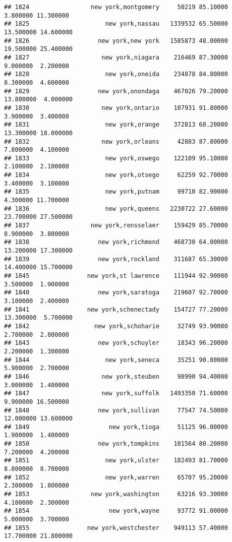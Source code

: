 \documentclass[
]{article}
\begin{document}
\begin{verbatim}
## 1824                 new york,montgomery     50219 85.10000  3.800000 11.300000
## 1825                     new york,nassau   1339532 65.50000 13.500000 14.600000
## 1826                   new york,new york   1585873 48.00000 19.500000 25.400000
## 1827                    new york,niagara    216469 87.30000  9.000000  2.200000
## 1828                     new york,oneida    234878 84.80000  8.300000  4.600000
## 1829                   new york,onondaga    467026 79.20000 13.800000  4.000000
## 1830                    new york,ontario    107931 91.80000  3.900000  3.400000
## 1831                     new york,orange    372813 68.20000 13.300000 18.000000
## 1832                    new york,orleans     42883 87.80000  7.800000  4.100000
## 1833                     new york,oswego    122109 95.10000  2.100000  2.100000
## 1834                     new york,otsego     62259 92.70000  3.400000  3.100000
## 1835                     new york,putnam     99710 82.90000  4.300000 11.700000
## 1836                     new york,queens   2230722 27.60000 23.700000 27.500000
## 1837                 new york,rensselaer    159429 85.70000  8.900000  3.800000
## 1838                   new york,richmond    468730 64.00000 13.200000 17.300000
## 1839                   new york,rockland    311687 65.30000 14.400000 15.700000
## 1845                new york,st lawrence    111944 92.90000  3.500000  1.900000
## 1840                   new york,saratoga    219607 92.70000  3.100000  2.400000
## 1841                new york,schenectady    154727 77.20000 13.300000  5.700000
## 1842                  new york,schoharie     32749 93.90000  2.700000  2.800000
## 1843                   new york,schuyler     18343 96.20000  2.200000  1.300000
## 1844                     new york,seneca     35251 90.80000  5.900000  2.700000
## 1846                    new york,steuben     98990 94.40000  3.000000  1.400000
## 1847                    new york,suffolk   1493350 71.60000  9.900000 16.500000
## 1848                   new york,sullivan     77547 74.50000 12.000000 13.600000
## 1849                      new york,tioga     51125 96.00000  1.900000  1.400000
## 1850                   new york,tompkins    101564 80.20000  7.200000  4.200000
## 1851                     new york,ulster    182493 81.70000  8.800000  8.700000
## 1852                     new york,warren     65707 95.20000  2.300000  1.800000
## 1853                 new york,washington     63216 93.30000  4.100000  2.300000
## 1854                      new york,wayne     93772 91.00000  5.000000  3.700000
## 1855                new york,westchester    949113 57.40000 17.700000 21.800000

\end{verbatim}
\end{document}
